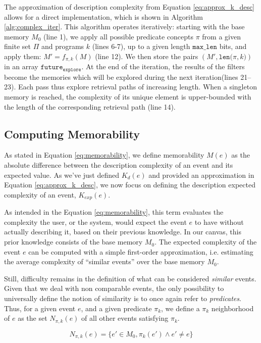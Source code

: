 \documentclass[conference]{IEEEtran}
\begin{document}
The approximation of description complexity from Equation \ref{eq:approx_k_desc} allows for
a direct implementation, which is shown in Algorithm \ref{alg:complex_iter}. This
algorithm operates iteratively: starting with the base memory $M_0$
(line 1), we apply all possible predicate concepts $\pi$ from a given finite set
$\Pi$ and programs $k$ (lines 6-7), up to a given length $\mathtt
  {max\_len}$ bits, and apply them: $M' = f_{\pi, k}(M)$ (line 12). We then store
the pairs $(M', \mathtt{len(}\pi, k\mathtt{)})$ in an array $\mathtt{future_
      {explore}}$. At the end of the iteration, the results of the filters become the
memories which will be explored during the next iteration(lines 21--23). Each
pass thus explore retrieval paths of increasing length. When a singleton memory
is reached, the complexity of its unique element is upper-bounded with the
length of the corresponding retrieval path (line 14).

\subsection{Computing Memorability}
As stated in Equation \ref{eq:memorability}, we define memorability $M(e)$ as the absolute difference between the description complexity of an event and its expected value. As we've just defined $K_d(e)$ and provided an approximation in Equation \ref{eq:approx_k_desc}, we now focus on defining the description expected complexity of an event, $K_{exp}(e)$.

As intended in the Equation \ref{eq:memorability}, this term evaluates the complexity the user, or the system, would expect the event $e$ to have without actually describing it, based on their previous knowledge. In our canvas, this prior knowledge consists of the base memory $M_0$. The expected complexity of the event $e$ can be computed with a simple first-order approximation, i.e. estimating the average complexity of ``similar events'' over the base memory $M_0$.

Still, difficulty remains in the definition of what
can be considered \emph{similar} events. Given that we deal with non comparable events, the only possibility to universally define the notion of similarity is to once again refer to \emph{predicates}. Thus, for a given event $e$, and a given predicate $\pi_k$, we define a $\pi_k$ neighborhood of $e$ as the set $N_{\pi, k}(e)$ of all other events satisfying $\pi_k$.

\begin{equation}
  \label{eq:similar}
  N_{\pi, k}(e) = \{e'\in M_0, \pi_k(e') \wedge e' \neq e\}
\end{equation}
\end{document}
